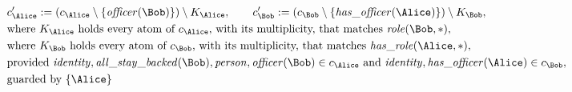 \begin{align*}
&
c'_
{
\Alice
}
 := 
(c_
{
\Alice
}
 \setminus 
\{
\mathit{\detokenize{
officer
}}
(
\Bob
)
\}
) \setminus K_
{
\Alice
}
, \qquad 
c'_
{
\Bob
}
 := 
(c_
{
\Bob
}
 \setminus 
\{
\mathit{\detokenize{
has_officer
}}
(
\Alice
)
\}
) \setminus K_
{
\Bob
}
,\\
&
\text{where } K_
{
\Alice
}
 \text{ holds every atom of } c_
{
\Alice
}
 \text{, with its multiplicity, that matches } 
\mathit{\detokenize{
role
}}
(
\Bob
,
\ast
)
,\\
&
\text{where } K_
{
\Bob
}
 \text{ holds every atom of } c_
{
\Bob
}
 \text{, with its multiplicity, that matches } 
\mathit{\detokenize{
has_role
}}
(
\Alice
,
\ast
)
,\\
&
\text{provided } 
\mathit{\detokenize{
identity
}}
,
\mathit{\detokenize{
all_stay_backed
}}
(
\Bob
)
,
\mathit{\detokenize{
person
}}
,
\mathit{\detokenize{
officer
}}
(
\Bob
)
 \in c_
{
\Alice
}
 \text{ and } 
\mathit{\detokenize{
identity
}}
,
\mathit{\detokenize{
has_officer
}}
(
\Alice
)
 \in c_
{
\Bob
}
,\\
&
\text{guarded by } \{
\Alice
\}
\end{align*}

